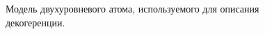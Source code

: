 \begin{figure}
\centering



\caption{Модель двухуровневого атома, используемого для описания декогеренции.}
\label{figAddDecoherenceModel}
\end{figure}
